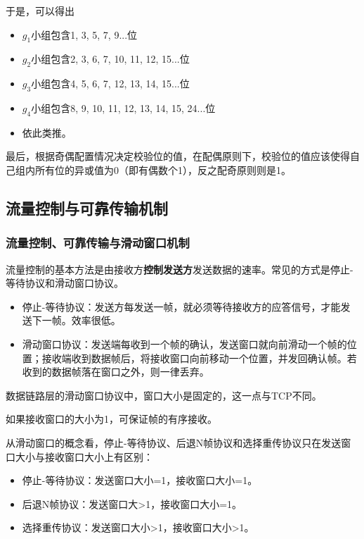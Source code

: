 \documentclass[12pt, a4paper, oneside]{ctexart}
\begin{document}
于是，可以得出
\begin{itemize}
    \item $g_1$小组包含1, 3, 5, 7, 9...位
    \item $g_2$小组包含2, 3, 6, 7, 10, 11, 12, 15...位
    \item $g_3$小组包含4, 5, 6, 7, 12, 13, 14, 15...位
    \item $g_4$小组包含8, 9, 10, 11, 12, 13, 14, 15, 24...位
    \item 依此类推。
\end{itemize}

最后，根据奇偶配置情况决定校验位的值，在配偶原则下，校验位的值应该使得自己组内所有位的异或值为0（即有偶数个1），反之配奇原则则是1。

\subsection{流量控制与可靠传输机制}

\subsubsection{流量控制、可靠传输与滑动窗口机制}

流量控制的基本方法是由接收方\textbf{控制发送方}发送数据的速率。常见的方式是停止-等待协议和滑动窗口协议。
\begin{itemize}
    \item 停止-等待协议：发送方每发送一帧，就必须等待接收方的应答信号，才能发送下一帧。效率很低。
    \item 滑动窗口协议：发送端每收到一个帧的确认，发送窗口就向前滑动一个帧的位置；接收端收到数据帧后，将接收窗口向前移动一个位置，并发回确认帧。若收到的数据帧落在窗口之外，则一律丢弃。
\end{itemize}

数据链路层的滑动窗口协议中，窗口大小是固定的，这一点与TCP不同。

如果接收窗口的大小为1，可保证帧的有序接收。

从滑动窗口的概念看，停止-等待协议、后退N帧协议和选择重传协议只在发送窗口大小与接收窗口大小上有区别：
\begin{itemize}
    \item 停止-等待协议：发送窗口大小=1，接收窗口大小=1。
    \item 后退N帧协议：发送窗口大>1，接收窗口大小=1。
    \item 选择重传协议：发送窗口大小>1，接收窗口大小>1。
\end{itemize}
\end{document}
